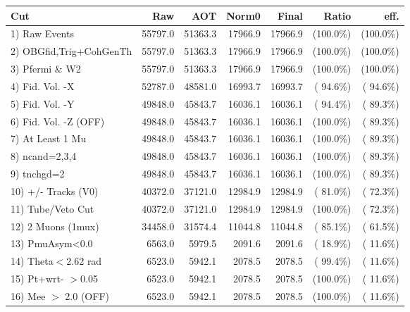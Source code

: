  \begin{table}[h!]\centering
 \begin{tabular}{||l||r|r|r|r|r|r||}
 \hline
 \hline
 Cut & Raw & AOT & Norm0 & Final & Ratio & eff.       \\
 \hline
  1) Raw Events           &      55797.0 &      51363.3 &      17966.9 &      17966.9 & (100.0\%) & (100.0\%) \\
  2) OBGfid,Trig+CohGenTh &      55797.0 &      51363.3 &      17966.9 &      17966.9 & (100.0\%) & (100.0\%) \\
  3) Pfermi \& W2         &      55797.0 &      51363.3 &      17966.9 &      17966.9 & (100.0\%) & (100.0\%) \\
  4) Fid. Vol. -X         &      52787.0 &      48581.0 &      16993.7 &      16993.7 & ( 94.6\%) & ( 94.6\%) \\
  5) Fid. Vol. -Y         &      49848.0 &      45843.7 &      16036.1 &      16036.1 & ( 94.4\%) & ( 89.3\%) \\
  6) Fid. Vol. -Z (OFF)   &      49848.0 &      45843.7 &      16036.1 &      16036.1 & (100.0\%) & ( 89.3\%) \\
  7) At Least 1 Mu        &      49848.0 &      45843.7 &      16036.1 &      16036.1 & (100.0\%) & ( 89.3\%) \\
  8) ncand=2,3,4          &      49848.0 &      45843.7 &      16036.1 &      16036.1 & (100.0\%) & ( 89.3\%) \\
  9) tnchgd=2             &      49848.0 &      45843.7 &      16036.1 &      16036.1 & (100.0\%) & ( 89.3\%) \\
 10) +/- Tracks (V0)      &      40372.0 &      37121.0 &      12984.9 &      12984.9 & ( 81.0\%) & ( 72.3\%) \\
 11) Tube/Veto Cut        &      40372.0 &      37121.0 &      12984.9 &      12984.9 & (100.0\%) & ( 72.3\%) \\
 12) 2 Muons (1mux)       &      34458.0 &      31574.4 &      11044.8 &      11044.8 & ( 85.1\%) & ( 61.5\%) \\
 13) PmuAsym<0.0          &       6563.0 &       5979.5 &       2091.6 &       2091.6 & ( 18.9\%) & ( 11.6\%) \\
 14) Theta$<$2.62 rad     &       6523.0 &       5942.1 &       2078.5 &       2078.5 & ( 99.4\%) & ( 11.6\%) \\
 15) Pt+wrt- $>$0.05      &       6523.0 &       5942.1 &       2078.5 &       2078.5 & (100.0\%) & ( 11.6\%) \\
 16) Mee $>$ 2.0  (OFF)   &       6523.0 &       5942.1 &       2078.5 &       2078.5 & (100.0\%) & ( 11.6\%) \\

\end{tabular}
\end{table}
